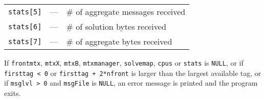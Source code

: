 \begin{enumerate}
\begin{center}
\begin{tabular}{ccl}
{\tt stats[5]} & --- & \# of aggregate messages received \\
{\tt stats[6]} & --- & \# of solution bytes received \\
{\tt stats[7]} & --- & \# of aggregate bytes received 
\end{tabular}
\end{center}
\par {}
If {\tt frontmtx}, {\tt mtxX}, {\tt mtxB}, {\tt mtxmanager},
{\tt solvemap}, {\tt cpus} or {\tt stats} is {\tt NULL}, 
or if {\tt firsttag < 0} or {\tt firsttag + 2*nfront} 
is larger than the largest available tag,
or if {\tt msglvl > 0} and {\tt msgFile} is {\tt NULL},
an error message is printed and the program exits.
\end{enumerate}
\par

